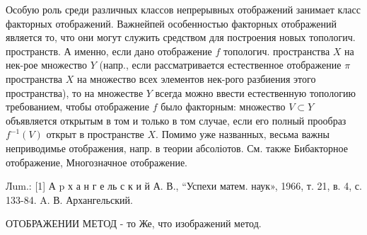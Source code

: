 \documentclass[10pt]{article}
\begin{document}
Особую роль среди различных классов непрерывных отображений занимает класс факторных отображений. Важнейпей особенностью факторных отображений является то, что они могут служить средством для построения новых топологич. пространств. А именно, если дано отображение $f$ топологич. пространства $X$ на нек-рое множество $Y$ (напр., если рассматривается естественное отображение $\pi$ пространства $X$ на множество всех элементов нек-рого разбиения этого пространства), то на множестве $Y$ всегда можно ввести естественную топологию требованием, чтобы отображение $f$ было факторным: множество $V \subset Y$ объявляется открытым в том и только в том случае, если его полный прообраз $f^{-1}(V)$ открыт в пространстве $X$. Помимо уже названных, весьма важны неприводимье отображения, напр. в теории абсоліотов. См. также Бибакторное отображение, Многозначное отображение.



Лum.: [1] А p х а н г е ль с к и й А. В., “Успехи матем. наук», 1966, т. 21, в. 4, с. 133-84. A. В. Архангельский.



ОТОБРАЖЕНИИ МЕТОД - то Же, что изображений метод.
\end{document}
